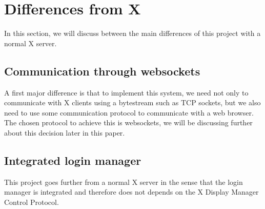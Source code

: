 \section{Differences from X}
In this section, we will discuss between the main differences of this project 
with a normal X server.
\subsection{Communication through websockets}
A first major difference is that to implement this system, we need 
not only to communicate with X clients using a bytestream such as 
TCP sockets, but we also need to use some communication protocol to 
communicate with a web browser. The chosen protocol to achieve this is 
websockets, we will be discussing further about this decision later in 
this paper.
\subsection{Integrated login manager}
This project goes further from a normal X server in the sense that the 
login manager is integrated and therefore does not depends on the 
X Display Manager Control Protocol.

